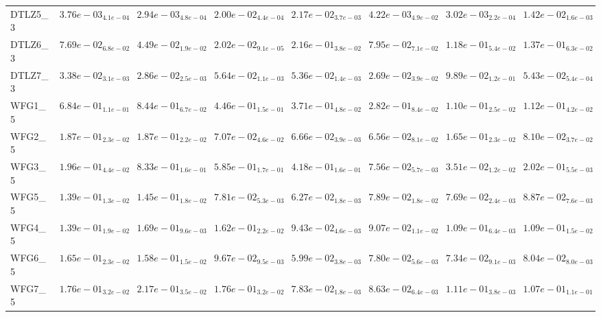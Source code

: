 \documentclass{article}
\begin{document}
\begin{landscape}
\begin{table}
\begin{scriptsize}
\begin{tabular}{llllllll}
DTLZ5\_3 & $  3.76e-03_{ 4.1e-04}$ & \cellcolor{gray95}$  2.94e-03_{ 4.8e-04}$ & $  2.00e-02_{ 4.4e-04}$ & $  2.17e-02_{ 3.7e-03}$ & $  4.22e-03_{ 4.9e-02}$ & \cellcolor{gray25}$  3.02e-03_{ 2.2e-04}$ & $  1.42e-02_{ 1.6e-03}$ \\
DTLZ6\_3 & $  7.69e-02_{ 6.8e-02}$ & \cellcolor{gray25}$  4.49e-02_{ 1.9e-02}$ & \cellcolor{gray95}$  2.02e-02_{ 9.1e-05}$ & $  2.16e-01_{ 3.8e-02}$ & $  7.95e-02_{ 7.1e-02}$ & $  1.18e-01_{ 5.4e-02}$ & $  1.37e-01_{ 6.3e-02}$ \\
DTLZ7\_3 & $  3.38e-02_{ 3.1e-03}$ & \cellcolor{gray25}$  2.86e-02_{ 2.5e-03}$ & $  5.64e-02_{ 1.1e-03}$ & $  5.36e-02_{ 1.4e-03}$ & \cellcolor{gray95}$  2.69e-02_{ 3.9e-02}$ & $  9.89e-02_{ 1.2e-01}$ & $  5.43e-02_{ 5.4e-04}$ \\
WFG1\_5 & $  6.84e-01_{ 1.1e-01}$ & $  8.44e-01_{ 6.7e-02}$ & $  4.46e-01_{ 1.5e-01}$ & $  3.71e-01_{ 4.8e-02}$ & $  2.82e-01_{ 8.4e-02}$ & \cellcolor{gray95}$  1.10e-01_{ 2.5e-02}$ & \cellcolor{gray25}$  1.12e-01_{ 4.2e-02}$ \\
WFG2\_5 & $  1.87e-01_{ 2.3e-02}$ & $  1.87e-01_{ 2.2e-02}$ & $  7.07e-02_{ 4.6e-02}$ & \cellcolor{gray25}$  6.66e-02_{ 3.9e-03}$ & \cellcolor{gray95}$  6.56e-02_{ 8.1e-02}$ & $  1.65e-01_{ 2.3e-02}$ & $  8.10e-02_{ 3.7e-02}$ \\
WFG3\_5 & $  1.96e-01_{ 4.4e-02}$ & $  8.33e-01_{ 1.6e-01}$ & $  5.85e-01_{ 1.7e-01}$ & $  4.18e-01_{ 1.6e-01}$ & \cellcolor{gray25}$  7.56e-02_{ 5.7e-03}$ & \cellcolor{gray95}$  3.51e-02_{ 1.2e-02}$ & $  2.02e-01_{ 5.5e-03}$ \\
WFG5\_5 & $  1.39e-01_{ 1.3e-02}$ & $  1.45e-01_{ 1.8e-02}$ & $  7.81e-02_{ 5.3e-03}$ & \cellcolor{gray95}$  6.27e-02_{ 1.8e-03}$ & $  7.89e-02_{ 1.8e-02}$ & \cellcolor{gray25}$  7.69e-02_{ 2.4e-03}$ & $  8.87e-02_{ 7.6e-03}$ \\
WFG4\_5 & $  1.39e-01_{ 1.9e-02}$ & $  1.69e-01_{ 9.6e-03}$ & $  1.62e-01_{ 2.2e-02}$ & \cellcolor{gray25}$  9.43e-02_{ 4.6e-03}$ & \cellcolor{gray95}$  9.07e-02_{ 1.1e-02}$ & $  1.09e-01_{ 6.4e-03}$ & $  1.09e-01_{ 1.5e-02}$ \\
WFG6\_5 & $  1.65e-01_{ 2.3e-02}$ & $  1.58e-01_{ 1.5e-02}$ & $  9.67e-02_{ 9.5e-03}$ & \cellcolor{gray95}$  5.99e-02_{ 3.8e-03}$ & $  7.80e-02_{ 5.6e-03}$ & \cellcolor{gray25}$  7.34e-02_{ 9.1e-03}$ & $  8.04e-02_{ 8.0e-03}$ \\
WFG7\_5 & $  1.76e-01_{ 3.2e-02}$ & $  2.17e-01_{ 3.5e-02}$ & $  1.76e-01_{ 3.2e-02}$ & \cellcolor{gray95}$  7.83e-02_{ 1.8e-03}$ & \cellcolor{gray25}$  8.63e-02_{ 6.4e-03}$ & $  1.11e-01_{ 3.8e-03}$ & $  1.07e-01_{ 1.1e-01}$ \\

\end{tabular}
\end{scriptsize}
\end{table}
\end{landscape}
\end{document}
